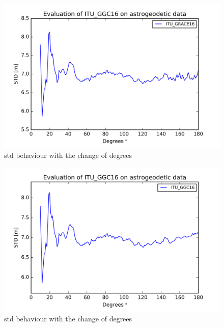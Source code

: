       
      \begin{figure}[t]
      	\caption{std behaviour with the change of degrees}
      	\label{itu_grace16_figure}
      	\includegraphics{Figures/ITU_GRACE16_figure.png}
      	\centering
      \end{figure}
      
      
      \begin{figure}[t]
      	\caption{std behaviour with the change of degrees}
      	\label{itu_ggc16_figure}
      	\includegraphics{Figures/ITU_GGC16_figure.png}
      	\centering
      \end{figure}
      
